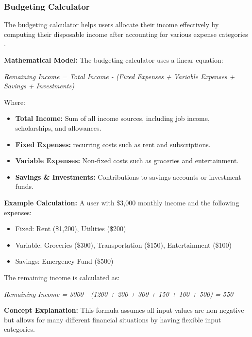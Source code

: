 \documentclass[11pt,twocolumn]{article}
\begin{document}
\subsubsection{Budgeting Calculator}
The budgeting calculator helps users allocate their income effectively by computing their disposable income after accounting for various expense categories \cite{budgeting}.

\textbf{Mathematical Model:}
The budgeting calculator uses a linear equation:
\vspace{0.5cm}

\textit {Remaining Income = Total Income - (Fixed Expenses + Variable Expenses + Savings + Investments)}

\vspace{0.5cm}

Where:
\begin{itemize}
    \item \textbf{Total Income:} Sum of all income sources, including job income, scholarships, and allowances.
    \item \textbf{Fixed Expenses:} recurring costs such as rent and subscriptions.
    \item \textbf{Variable Expenses:} Non-fixed costs such as groceries and entertainment.
    \item \textbf{Savings \& Investments:} Contributions to savings accounts or investment funds.
\end{itemize}

\textbf{Example Calculation:}  
A user with \$3,000 monthly income and the following expenses:
\begin{itemize}
    \item Fixed: Rent (\$1,200), Utilities (\$200)
    \item Variable: Groceries (\$300), Transportation (\$150), Entertainment (\$100)
    \item Savings: Emergency Fund (\$500)
\end{itemize}

The remaining income is calculated as:

\vspace{0.5cm}

\textit {Remaining Income = 3000 - (1200 + 200 + 300 + 150 + 100 + 500) = 550}

\vspace{0.5cm}

\textbf{Concept Explanation:}  
 This formula assumes all input values are non-negative but allows for many different financial situations by having flexible input categories.
\end{document}
